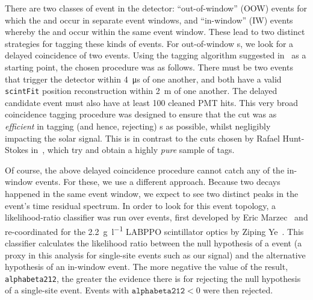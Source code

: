 There are two classes of  event in the detector: ``out-of-window'' (OOW) events for which the  and  occur in separate event windows, and ``in-window'' (IW) events whereby the  and  occur within the same event window. These lead to two distinct strategies for tagging these kinds of events. For out-of-window s, we look for a delayed coincidence of two events. Using the tagging algorithm suggested in~\cite{} %
as a starting point, the chosen procedure was as follows. There must be two events that trigger the detector within \SI{4}{\micro\second} of one another, and both have a valid \texttt{scintFit} position reconstruction within \SI{2}{\metre} of one another. The delayed candidate event must also have at least 100 cleaned PMT hits. %
This very broad coincidence tagging procedure was designed to ensure that the cut was as \textit{efficient} in tagging (and hence, rejecting) s as possible, whilst negligibly impacting the solar signal. This is in contrast to the cuts chosen by Rafael Hunt-Stokes in~\cite{}, %
which try and obtain a highly \textit{pure} sample of  tags.

Of course, the above delayed coincidence procedure cannot catch any of the in-window  events. For these, we use a different approach. Because two decays happened in the same event window, we expect to see two distinct peaks in the event's time residual spectrum. In order to look for this event topology, a likelihood-ratio classifier was run over events, first developed by Eric Marzec~\cite{} %
and re-coordinated for the \SI{2.2}{\gram\per\litre} LABPPO scintillator optics by Ziping Ye~\cite{}. %
This classifier calculates the likelihood ratio between the null hypothesis of a \onbb{} event (a proxy in this analysis for single-site events such as our \beight{} signal) and the alternative hypothesis of an in-window  event. The more negative the value of the result, \texttt{alphabeta212}, the greater the evidence there is for rejecting the null hypothesis of a single-site event. Events with $\texttt{alphabeta212} < 0$ %
were then rejected.

